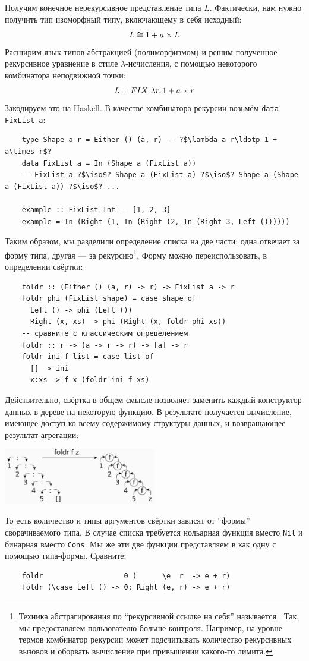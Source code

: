 Получим конечное нерекурсивное представление типа $L$.
Фактически, нам нужно получить тип изоморфный типу, включающему в себя исходный:
\[
    L \cong 1 + a \times L
\]
Расширим язык типов абстракцией (полиморфизмом) и решим полученное рекурсивное уравнение в стиле $\lambda$-исчисления, с помощью некоторого комбинатора неподвижной точки:
\[
    L = FIX~\lambda r\ldotp 1 + a \times r
\]
Закодируем это на Haskell.
В качестве комбинатора рекурсии возьмём \texttt{data FixList a}:
\begin{verbatim}
    type Shape a r = Either () (a, r) -- ?$\lambda a r\ldotp 1 + a\times r$?
    data FixList a = In (Shape a (FixList a))
    -- FixList a ?$\iso$? Shape a (FixList a) ?$\iso$? Shape a (Shape a (FixList a)) ?$\iso$? ...

    example :: FixList Int -- [1, 2, 3]
    example = In (Right (1, In (Right (2, In (Right 3, Left ())))))
\end{verbatim}

Таким образом, мы разделили определение списка на две части: одна отвечает за форму типа, другая --- за рекурсию\footnote{Техника абстрагирования по ``рекурсивной ссылке на себя'' называется . Так, мы предоставляем пользователю больше контроля. Например, на уровне термов комбинатор рекурсии может подсчитывать количество рекурсивных вызовов и оборвать вычисление при привышении какого-то лимита.}.
Форму можно переиспользовать, в определении свёртки:
\begin{verbatim}
    foldr :: (Either () (a, r) -> r) -> FixList a -> r
    foldr phi (FixList shape) = case shape of
      Left () -> phi (Left ())
      Right (x, xs) -> phi (Right (x, foldr phi xs))
    -- сравните с классическим определением
    foldr :: r -> (a -> r -> r) -> [a] -> r
    foldr ini f list = case list of
      [] -> ini
      x:xs -> f x (foldr ini f xs)
\end{verbatim}
Действительно, свёртка в общем смысле позволяет заменить каждый конструктор данных в дереве на некоторую функцию.
В результате получается вычисление, имеющее доступ ко всему содержимому структуры данных, и возвращающее результат агрегации:
\begin{center}
    \includegraphics[width=0.5\textwidth]{figs/foldr}
\end{center}
То есть количество и типы аргументов свёртки зависят от ``формы'' сворачиваемого типа.
В случае списка требуется нольарная функция вместо \texttt{Nil} и бинарная вместо \texttt{Cons}.
Мы же эти две функции представляем в как одну с помощью типа-формы.
Сравните:
\begin{verbatim}
    foldr                   0 (      \e  r  -> e + r)
    foldr (\case Left () -> 0; Right (e, r) -> e + r)
\end{verbatim}

